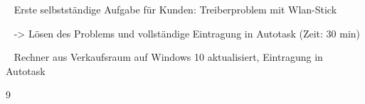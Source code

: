 {{	\textbullet~ Erste selbstständige Aufgabe für Kunden: Treiberproblem mit Wlan-Stick\par
	\textbullet~ -> Lösen des Problems und vollständige Eintragung in Autotask (Zeit: 30 min)\par
	\textbullet~ Rechner aus Verkaufsraum auf Windows 10 aktualisiert, Eintragung in Autotask
	}{}{9}
}{}
\Unterschrift
\newpage
